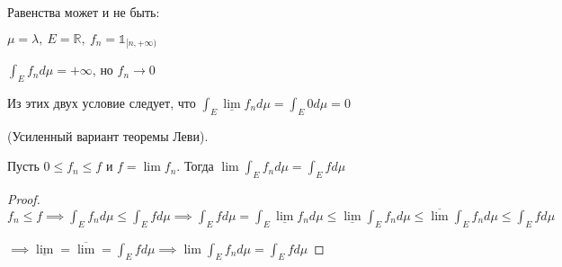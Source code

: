 \begin{remark}
    Равенства может и не быть:

    $\mu = \lambda, \ E = \mathbb{R}, \ f_n = \mathbb{1}_{[n, +\infty)}$

    $\int_E{f_n d \mu} = +\infty$, но $f_n \rightarrow 0$

    Из этих двух условие следует, что $\int_E{\underline{\lim}{f_n d \mu}} = \int_E{0 d \mu} = 0$
\end{remark}



\begin{consequence}
    (Усиленный вариант теоремы Леви).

    Пусть $0 \leq f_n \leq f$ и $f = \lim{f_n}$. Тогда $\lim{\int_E{f_n d \mu}} = \int_E{f d \mu}$
\end{consequence}
\begin{proof}
    $f_n \leq f \implies \int_E{f_n d \mu} \leq \int_E{f d \mu} \implies \int_E{f d \mu} = \int_E{\underline{\lim}{f_n} d \mu} \leq \underline{\lim}{\int_E{f_n d \mu}} \leq \overline{\lim}{\int_E{f_n d \mu}} \leq \int_E{f d \mu}$

    $\implies \underline{\lim} = \overline{\lim} = \int_E{f d \mu} \implies \lim{\int_E{f_n d \mu}} = \int_E{f d \mu}$
\end{proof}

